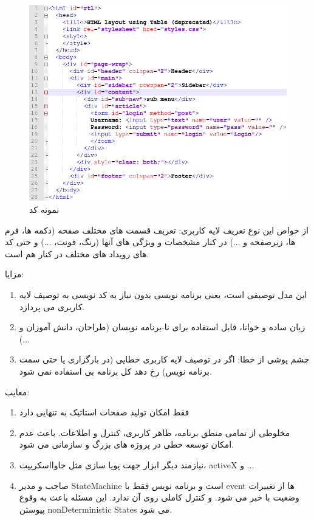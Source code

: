 \documentclass{CSICC2020}
\begin{document}
\begin{figure}
\includegraphics[width=.95\linewidth]{Images/html}
\caption{نمونه کد }
\label{fig:HTML}
\end{figure}

از خواص این نوع تعریف لایه کاربری: تعریف قسمت های مختلف صفحه (دکمه ها، فرم ها، زیرصفحه و ...) در کنار مشخصات و ویژگی های آنها (رنگ، فونت، ...) و حتی کد های رویداد های مختلف در کنار هم است.

مزایا:
\begin{enumerate} 
\item این مدل توصیفی است، یعنی برنامه نویسی بدون نیاز به کد نویسی به توصیف لایه کاربری می پردازد.
\item زبان ساده و خوانا، قابل استفاده برای نا-برنامه نویسان (طراحان، دانش آموزان و ...)
\item چشم پوشی از خطا: اگر در توصیف لایه کاربری خطایی (در بارگزاری یا حتی سمت برنامه نویس) رخ دهد کل برنامه بی استفاده نمی شود.
\end{enumerate} 

معایب:
\begin{enumerate} 
\item فقط امکان تولید صفحات استاتیک به تنهایی دارد
\item مخلوطی از تمامی منطق برنامه، ظاهر کاربری، کنترل و اطلاعات. باعث عدم امکان توسعه خطی در پروژه های بزرگ و سازمانی می شود.
\item نیازمند دیگر ابزار جهت پویا سازی مثل جاوااسکریپت، activeX و ...
\item صاحب و مدیر StateMachine است و برنامه نویس فقط با event ها از تغییرات وضعیت با خبر می شود. و کنترل کاملی روی آن ندارد. این مسئله باعث به وقوع پیوستن nonDeterministic States می شود.
\end{enumerate} 
\end{document}
